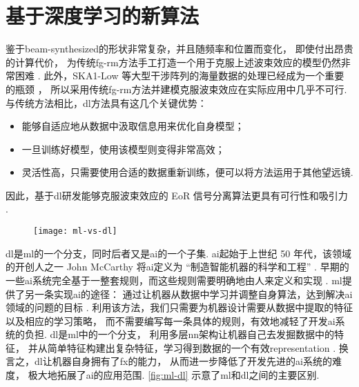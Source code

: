 \section{基于深度学习的新算法}

鉴于\ac{beam-synthesized}的形状非常复杂，并且随频率和位置而变化，
即使付出昂贵的计算代价，
为传统\ac{fg-rm}方法手工打造一个用于克服上述波束效应的模型仍然非常困难
\cite{lochner2015}.
此外，SKA1-Low 等大型干涉阵列的海量数据的处理已经成为一个重要的瓶颈
\cite{norris2011,dolensky2016,chrysostomou2018}，
所以采用传统\ac{fg-rm}方法并建模克服波束效应在实际应用中几乎不可行.
与传统方法相比，\ac{dl}方法具有这几个关键优势：
\begin{itemize}
  \item 能够自适应地从数据中汲取信息用来优化自身模型；
  \item 一旦训练好模型，使用该模型则变得非常高效；
  \item 灵活性高，只需要使用合适的数据重新训练，便可以将方法运用于其他望远镜.
\end{itemize}
因此，基于\ac{dl}研发能够克服波束效应的 EoR 信号分离算法更具有可行性和吸引力
\cite{herbel2018,vafaeiSadr2019}.

\begin{figure}[htp]
  \centering
  \texttt{[image: ml-vs-dl]}
  \label{fig:ml-dl}
\end{figure}

\ac{dl}是\ac{ml}的一个分支，同时后者又是\ac{ai}的一个子集.
\ac{ai}起始于上世纪 50 年代，该领域的开创人之一 John McCarthy 将\ac{ai}定义为
\enquote{制造智能机器的科学和工程} \cite{mcCarthy2007}.
早期的一些\ac{ai}系统完全基于一整套规则，而这些规则需要明确地由人来定义和实现
\cite{haugeland1985,jackson1998}.
\ac{ml}提供了另一条实现\ac{ai}的途径：
通过让机器从数据中学习并调整自身算法，达到解决\ac{ai}领域的问题的目标
\cite{samuel1959,mitchell1997}.
利用该方法，我们只需要为机器设计需要从数据中提取的特征以及相应的学习策略，
而不需要编写每一条具体的规则，有效地减轻了开发\ac{ai}系统的负担.
\ac{dl}是\ac{ml}中的一个分支，
利用多层\ac{nn}架构让机器自己去发掘数据中的特征，
并从简单特征构建出复杂特征，学习得到数据的一个有效\ac{representation}
\cite{bengio2013rl,schmidhuber2015,goodfellow2016}.
换言之，\ac{dl}让机器自身拥有了\ac{fx}的能力，
从而进一步降低了开发先进的\ac{ai}系统的难度，
极大地拓展了\ac{ai}的应用范围.
\autoref{fig:ml-dl} 示意了\ac{ml}和\ac{dl}之间的主要区别.

